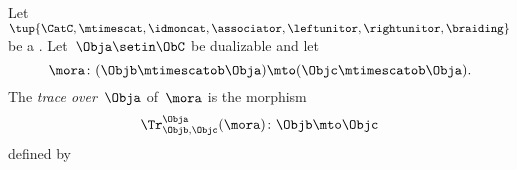 \begin{widepar}
    \begin{ctdefinition}
        \label{def:trace_gen_endo}
        Let~$\tup{\CatC, \mtimescat, \idmoncat, \associator, \leftunitor, \rightunitor, \braiding}$ be a .
        Let~$\Obja \setin \ObC$ be dualizable and let
        \begin{equation}
            \mora \colon (\Objb \mtimescatob \Obja) \mto( \Objc \mtimescatob \Obja).
        \end{equation}
        The \emph{trace over}~$\Obja$ of~$\mora$ is the morphism
        \begin{equation}
            \Tr_{\Objb, \Objc}^\Obja (\mora) \colon \Objb \mto \Objc
        \end{equation}
        defined by
    \end{ctdefinition}
\end{widepar}

%
%
%
%
%
%

